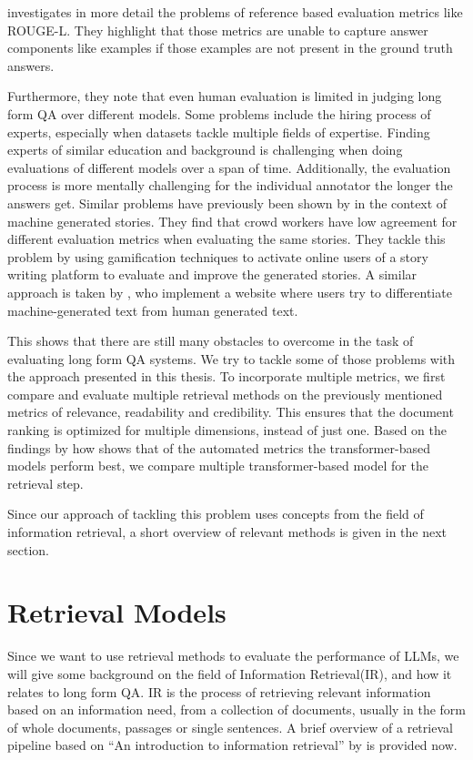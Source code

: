 \cite{krishna:2021:Hurdles} investigates in more detail the problems of reference based evaluation metrics like ROUGE-L. 
They highlight that those metrics are unable to capture answer components like examples if those examples are not present in the ground truth answers. 

Furthermore, they note that even human evaluation is limited in judging long form QA over different models.
Some problems include the hiring process of experts, especially when datasets tackle multiple fields of expertise.
Finding experts of similar education and background is challenging when doing evaluations of different models over a span of time.
Additionally, the evaluation process is more mentally challenging for the individual annotator the longer the answers get.
Similar problems have previously been shown by \cite{akoury:2020:Storium} in the context of machine generated stories.
They find that crowd workers have low agreement for different evaluation metrics when evaluating the same stories.
They tackle this problem by using gamification techniques to activate online users of a story writing platform to evaluate and improve the generated stories.
A similar approach is taken by \cite{dugan:2020:RoFT}, who implement a website where users try to differentiate machine-generated text from human generated text.

This shows that there are still many obstacles to overcome in the task of evaluating long form QA systems.
We try to tackle some of those problems with the approach presented in this thesis.
To incorporate multiple metrics, we first compare and evaluate multiple retrieval methods on the previously mentioned metrics of relevance, readability and credibility.
This ensures that the document ranking is optimized for multiple dimensions, instead of just one.
Based on the findings by \cite{xu:2023:A} how shows that of the automated metrics the transformer-based models perform best, we compare multiple transformer-based model for the retrieval step.

Since our approach of tackling this problem uses concepts from the field of information retrieval, a short overview of relevant methods is given in the next section.


\section{Retrieval Models}\label{sec:retrieval-models}
Since we want to use retrieval methods to evaluate the performance of LLMs, we will give some background on the field of Information Retrieval(IR), and how it relates to long form QA.
IR is the process of retrieving relevant information based on an information need, from a collection of documents, usually in the form of whole documents, passages or single sentences.
A brief overview of a retrieval pipeline based on ``An introduction to information retrieval'' by \cite{manning:2009:An} is provided now.


